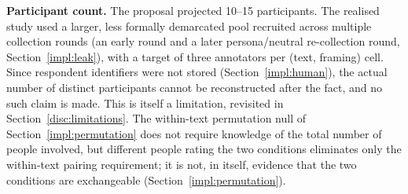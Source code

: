 \textbf{Participant count.} The proposal projected 10--15 participants. The
realised study used a larger, less formally demarcated pool recruited across multiple collection
rounds (an early round and a later persona/neutral re-collection round, Section~\ref{impl:leak}),
with a target of three annotators per (text, framing) cell. Since respondent identifiers were not
stored (Section~\ref{impl:human}), the actual number of distinct participants cannot be
reconstructed after the fact, and no such claim is made. This is itself a limitation, revisited in
Section~\ref{disc:limitations}. The within-text permutation null of Section~\ref{impl:permutation}
does not require knowledge of the total number of people involved, but different people rating
the two conditions eliminates only the within-text pairing requirement; it is not, in itself,
evidence that the two conditions are exchangeable (Section~\ref{impl:permutation}).
